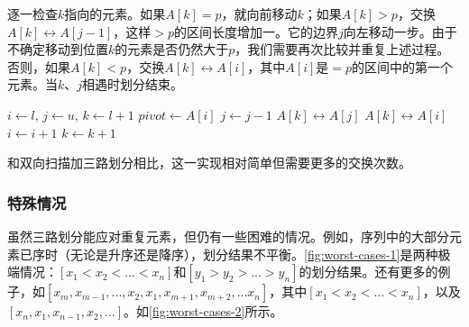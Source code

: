 \documentclass[b5paper]{ctexart}
\begin{document}
逐一检查$k$指向的元素。如果$A[k] = p$，就向前移动$k$；如果$A[k] > p$，交换$A[k] \leftrightarrow A[j-1]$，这样$> p$的区间长度增加一。它的边界$j$向左移动一步。由于不确定移动到位置$k$的元素是否仍然大于$p$，我们需要再次比较并重复上述过程。否则，如果$A[k] < p$，交换$A[k] \leftrightarrow A[i]$，其中$A[i]$是$= p$的区间中的第一个元素。当$k$、$j$相遇时划分结束。

\begin{algorithmic}[1]
    \State $i \gets l$, $j \gets u$, $k \gets l + 1$
    \State $pivot \gets A[i]$
        \State $j \gets j - 1$
        \State {} $A[k] \leftrightarrow A[j]$
      \EndWhile
        \State {} $A[k] \leftrightarrow A[i]$
        \State $i \gets i + 1$
      \EndIf
      \State $k \gets k + 1$
    \EndWhile
    \State {}
    \State {}
  \EndIf
\EndProcedure
\end{algorithmic}

和双向扫描加三路划分相比，这一实现相对简单但需要更多的交换次数。

\subsubsection{特殊情况}

虽然三路划分能应对重复元素，但仍有一些困难的情况。例如，序列中的大部分元素已序时（无论是升序还是降序），划分结果不平衡。\cref{fig:worst-cases-1}是两种极端情况：$[x_1 < x_2 < ... < x_n]$和$[y_1 > y_2 > ... > y_n]$的划分结果。还有更多的例子，如$[x_m, x_{m-1}, ..., x_2, x_1, x_{m+1}, x_{m+2}, ... x_n]$，其中$[ x_1 < x_2 < ... < x_n]$，以及$[x_n, x_1, x_{n-1}, x_2, ... ]$。如\cref{fig:worst-cases-2}所示。
\end{document}
